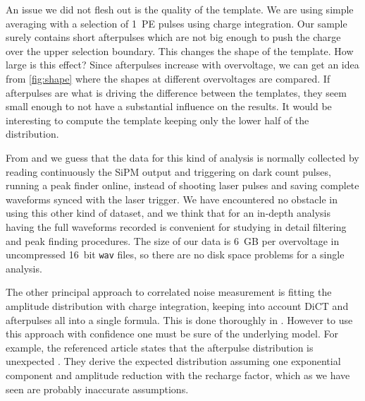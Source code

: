 
An issue we did not flesh out is the quality of the template. We are using
simple averaging with a selection of 1~PE pulses using charge integration. Our
sample surely contains short afterpulses which are not big enough to push the
charge over the upper selection boundary. This changes the shape of the
template. How large is this effect? Since afterpulses increase with
overvoltage, we can get an idea from \autoref{fig:shape} where the shapes at
different overvoltages are compared. If afterpulses are what is driving the
difference between the templates, they seem small enough to not have a
substantial influence on the results. It would be interesting to compute the
template keeping only the lower half of the distribution.


From \cite{savarese2018} and \cite{nagy2014} we guess that the data for this
kind of analysis is normally collected by reading continuously the SiPM output
and triggering on dark count pulses, running a peak finder online, instead of
shooting laser pulses and saving complete waveforms synced with the laser
trigger. We have encountered no obstacle in using this other kind of dataset,
and we think that for an in-depth analysis having the full waveforms recorded
is convenient for studying in detail filtering and peak finding procedures. The
size of our data is \SI{6}{GB} per overvoltage in uncompressed \SI{16}{bit}
\texttt{wav} files, so there are no disk space problems for a single analysis.

The other principal approach to correlated noise measurement is fitting the
amplitude distribution with charge integration, keeping into account DiCT and
afterpulses all into a single formula. This is done thoroughly in
\cite{chmill2017}. However to use this approach with confidence one must be
sure of the underlying model. For example, the referenced article states that
the afterpulse distribution is unexpected \cite[app.~A]{chmill2017}. They
derive the expected distribution assuming one exponential component and
amplitude reduction with the recharge factor, which as we have seen are
probably inaccurate assumptions.

